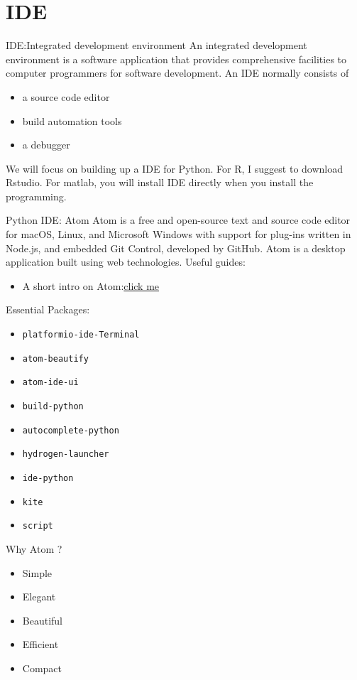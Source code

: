 \documentclass[handout]{beamer} %
\begin{document}
\section{IDE}

\begin{frame}{IDE:Integrated development environment}
	An integrated development environment is a software application that provides comprehensive facilities to computer programmers for software development. An IDE normally consists of
	\begin{itemize}
	\setlength\itemsep{1em}
		\item a source code editor
		\item build automation tools
		\item a debugger
	\end{itemize}
We will focus on building up a IDE for Python. For R, I suggest to download Rstudio. For matlab, you will install IDE directly when you install the programming.
\end{frame}

\begin{frame}{Python IDE: Atom}
	Atom is a free and open-source text and source code editor for macOS, Linux, and Microsoft Windows with support for plug-ins written in Node.js, and embedded Git Control, developed by GitHub. Atom is a desktop application built using web technologies. Useful guides:
	\begin{itemize}
		\item A short intro on Atom:\href{https://blog.atom.io/2017/09/12/announcing-atom-ide.html}{click me \Coffeecup}
	\end{itemize}
Essential Packages:
\begin{itemize}
	\item \texttt{platformio-ide-Terminal}
	\item \texttt{atom-beautify}
	\item \texttt{atom-ide-ui}
	\item \texttt{build-python}
	\item \texttt{autocomplete-python}
	\item \texttt{hydrogen-launcher}
	\item \texttt{ide-python}
	\item \texttt{kite}
	\item \texttt{script}
\end{itemize}
\end{frame}

\begin{frame}{Why Atom ?}
	\begin{itemize}
	\setlength\itemsep{1em}
		\item Simple
		\item Elegant
		\item Beautiful
		\item Efficient
		\item Compact
	\end{itemize}
\end{frame}
\end{document}
